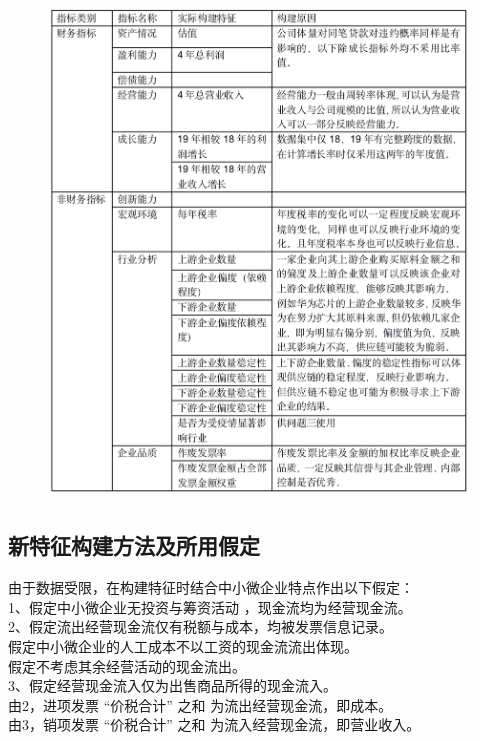 \documentclass[bwprint]{cumcm}
\begin{document}
\begin{figure}[h]%
	\centering  %
	\includegraphics[width=1\linewidth]{figures/figure2.jpg}  %
	\label{fig:mcmthesis-logo}   %
\end{figure}

\newpage
\subsection{\heiti 新特征构建方法及所用假定}

\noindent 由于数据受限，在构建特征时结合中小微企业特点作出以下假定：\\
 1、假定中小微企业无投资与筹资活动 ，现金流均为经营现金流。\\
2、假定流出经营现金流仅有税额与成本，均被发票信息记录。\\
 假定中小微企业的人工成本不以工资的现金流流出体现。\\
 假定不考虑其余经营活动的现金流出。\\
3、假定经营现金流入仅为出售商品所得的现金流入。\\
由2，进项发票 “价税合计” 之和 为流出经营现金流，即成本。\\
由3，销项发票 “价税合计” 之和 为流入经营现金流，即营业收入。\\
\end{document}
